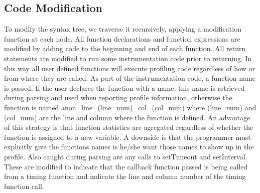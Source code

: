 \documentclass[11pt]{article}
\begin{document}
\subsection{Code Modification}
	
	To modify the syntax tree, we traverse it recursively, applying a modification function at each node.
All function declarations and function expressions are modified by adding code to the beginning and end 
of each function. All return statements are modified to run some instrumentation code prior to returning. 
In this way all user defined functions will execute profiling code regardless of how or from where 
they are called. As part of the instrumentation code, a function name is passed. If the user declares 
the function with a name, this name is retrieved during parsing and used when reporting profile information, 
otherwise the function is named anon\_line\_(line\_num)\_col\_(col\_num) where (line\_num) and (col\_num) are the line 
and column where the function is defined. An advantage of this strategy is that function statistics are 
agregated regardless of whether the function is assigned to a new variable. A downside is that the programmer 
must explicitly give the functions names is he/she want those names to show up in the profile. Also caught 
during parsing are any calls to setTimeout and setInterval. These are modified to 
indicate that the callback function passed is being called from a timing function and indicate the 
line and column number of the timing function call. 
\end{document}
